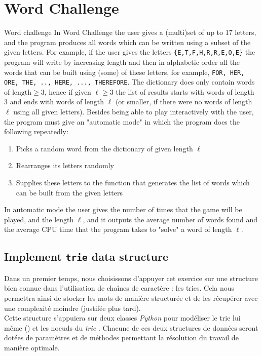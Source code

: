 \documentclass[10pt,a4paper,hidelinks]{article}
\newcommand{\colorverb}[2]{\textcolor{#1}{\texttt{\detokenize{#2}}}}
\newcommand{\type}[1]{\colorverb{green!50!black}{#1}}
\begin{document}
\section{Word Challenge}
\begin{exercise_description}{Word challenge}
    In Word Challenge the user gives a (multi)set of up to 17 letters, and the program produces all words which can be written using a subset of the given letters. For example, if the user gives the letters \verb|{E,T,F,H,R,R,E,O,E}| the program will write by increasing length and then in alphabetic order all the words that can be built using (some) of these letters, for example, \verb|FOR, HER, ORE, THE, .., HERE, ..., THEREFORE|. The dictionary does only contain words of $\text{length}\geqslant  3$, hence if given $\ell \geqslant 3$ the list of results starts with words of length 3 and ends with words of length $\ell$ (or smaller, if there were no words of length $\ell$ using all given letters). Besides being able to play interactively with the user, the program must give an "automatic mode" in which the program does the following repeatedly:
    \begin{enumerate}
    \item Picks a random word from the dictionary of given length $\ell$
    \item Rearranges its letters randomly
    \item Supplies these letters to the function that generates the list of words which can be built from the given letters
    \end{enumerate}
    In automatic mode the user gives the number of times that the game will be played, and the length $\ell$, and it outputs the average number of words found and the average CPU time that the program takes to "solve" a word of length $\ell$.
\end{exercise_description}


\subsection{Implement \texttt{trie} data structure}
Dans un premier temps, nous choisissons d'appuyer cet exercice sur une structure bien connue dans l'utilisation de chaînes de caractère : les tries. Cela nous permettra ainsi de stocker les mots de manière structurée et de les récupérer avec une complexité moindre (justifée plus tard).\\

Cette structure s'appuiera sur deux classes \textit{Python} pour modéliser le trie lui même (\type{Trie}) et les noeuds du \textit{trie} \type{TrieNode}. Chacune de ces deux structures de données seront dotées de paramètres et de méthodes permettant la résolution du travail de manière optimale.
\end{document}
